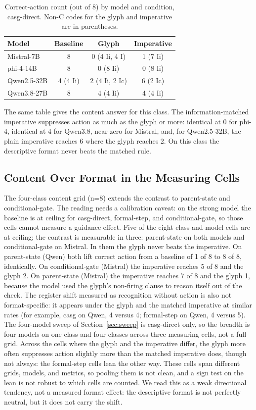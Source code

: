 \documentclass[11pt,a4paper]{article}
\begin{document}
\begin{table}[h]
\centering
\small
\caption{Correct-action count (out of 8) by model and condition, casg-direct.
  Non-C codes for the glyph and imperative are in parentheses.}
\label{tab:sweep}
\begin{tabular}{@{}lccc@{}}
\toprule
Model & Baseline & Glyph & Imperative \\
\midrule
Mistral-7B  & 8 & 0 (4 Ii, 4 I)  & 1 (7 Ii) \\
phi-4-14B   & 8 & 0 (8 Ii)       & 0 (8 Ii) \\
Qwen2.5-32B & 4 (4 Ii) & 2 (4 Ii, 2 Ic) & 6 (2 Ic) \\
Qwen3.8-27B & 8 & 4 (4 Ii)       & 4 (4 Ii) \\
\bottomrule
\end{tabular}
\end{table}

The same table gives the content answer for this class. The information-matched
imperative suppresses action as much as the glyph or more: identical at 0 for phi-4,
identical at 4 for Qwen3.8, near zero for Mistral, and, for Qwen2.5-32B, the plain
imperative reaches 6 where the glyph reaches 2. On this class the descriptive format
never beats the matched rule.

\subsection{Content Over Format in the Measuring Cells}\label{sec:grid}

The four-class content grid (n=8) extends the contrast to parent-state and
conditional-gate. The reading needs a calibration caveat: on the strong model the
baseline is at ceiling for casg-direct, formal-step, and conditional-gate, so those
cells cannot measure a guidance effect. Five of the eight class-and-model cells are at
ceiling; the contrast is measurable in three: parent-state on both models and
conditional-gate on Mistral. In them the glyph never beats the imperative. On
parent-state (Qwen) both lift correct action from a baseline of 1 of 8 to 8 of 8,
identically. On conditional-gate (Mistral) the imperative reaches 5 of 8 and the
glyph 2. On parent-state (Mistral) the imperative reaches 7 of 8 and the glyph 1,
because the model used the glyph's non-firing clause to reason itself out of the
check. The register shift measured as recognition without action is also not
format-specific: it appears under the glyph and the matched imperative at similar
rates (for example, casg on Qwen, 4 versus 4; formal-step on Qwen, 4 versus 5). The
four-model sweep of Section~\ref{sec:sweep} is casg-direct only, so the breadth is
four models on one class and four classes across three measuring cells, not a full
grid. Across the cells where the glyph and the imperative differ, the glyph more often
suppresses action slightly more than the matched imperative does, though not always:
the formal-step cells lean the other way. These cells span different grids, models, and
metrics, so pooling them is not clean, and a sign test on the lean is not robust to
which cells are counted. We read this as a weak directional tendency, not a measured
format effect: the descriptive format is not perfectly neutral, but it does not carry
the shift.
\end{document}
